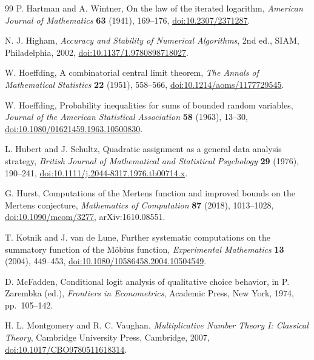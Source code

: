 \documentclass[11pt,reqno]{amsart}
\numberwithin{equation}{section}
\theoremstyle{plain}
\theoremstyle{definition}
\theoremstyle{remark}
\begin{document}
\begin{thebibliography}{99}
P. Hartman and A. Wintner,
\newblock On the law of the iterated logarithm,
\newblock \emph{American Journal of Mathematics} \textbf{63} (1941),
169--176,
\newblock \href{https://doi.org/10.2307/2371287}
{doi:10.2307/2371287}.

N. J. Higham,
\newblock \emph{Accuracy and Stability of Numerical Algorithms}, 2nd ed.,
\newblock SIAM, Philadelphia, 2002,
\newblock \href{https://doi.org/10.1137/1.9780898718027}
{doi:10.1137/1.9780898718027}.

W. Hoeffding,
\newblock A combinatorial central limit theorem,
\newblock \emph{The Annals of Mathematical Statistics} \textbf{22} (1951),
558--566,
\newblock \href{https://doi.org/10.1214/aoms/1177729545}
{doi:10.1214/aoms/1177729545}.

W. Hoeffding,
\newblock Probability inequalities for sums of bounded random variables,
\newblock \emph{Journal of the American Statistical Association}
\textbf{58} (1963), 13--30,
\newblock \href{https://doi.org/10.1080/01621459.1963.10500830}
{doi:10.1080/01621459.1963.10500830}.

L. Hubert and J. Schultz,
\newblock Quadratic assignment as a general data analysis strategy,
\newblock \emph{British Journal of Mathematical and Statistical Psychology}
\textbf{29} (1976), 190--241,
\newblock \href{https://doi.org/10.1111/j.2044-8317.1976.tb00714.x}
{doi:10.1111/j.2044-8317.1976.tb00714.x}.

G. Hurst,
\newblock Computations of the Mertens function and improved bounds on the
Mertens conjecture,
\newblock \emph{Mathematics of Computation} \textbf{87} (2018), 1013--1028,
\newblock \href{https://doi.org/10.1090/mcom/3277}
{doi:10.1090/mcom/3277}, arXiv:1610.08551.

T. Kotnik and J. van de Lune,
\newblock Further systematic computations on the summatory function of the
M\"obius function,
\newblock \emph{Experimental Mathematics} \textbf{13} (2004), 449--453,
\newblock \href{https://doi.org/10.1080/10586458.2004.10504549}
{doi:10.1080/10586458.2004.10504549}.

D. McFadden,
\newblock Conditional logit analysis of qualitative choice behavior,
\newblock in P. Zarembka (ed.), \emph{Frontiers in Econometrics},
Academic Press, New York, 1974, pp.~105--142.

H. L. Montgomery and R. C. Vaughan,
\newblock \emph{Multiplicative Number Theory I: Classical Theory},
\newblock Cambridge University Press, Cambridge, 2007,
\newblock \href{https://doi.org/10.1017/CBO9780511618314}
{doi:10.1017/CBO9780511618314}.


\end{thebibliography}
\end{document}
